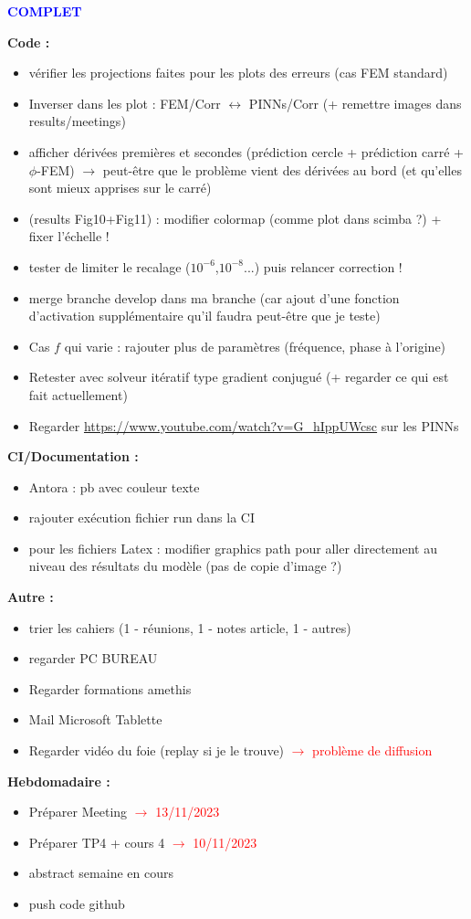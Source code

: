 \textcolor{blue}{\textbf{\large{COMPLET}}}

\textbf{Code :}
\begin{itemize}[label=$\square$]
	\item[\later] vérifier les projections faites pour les plots des erreurs (cas FEM standard)
	\item[\wontfix] Inverser dans les plot : FEM/Corr $\leftrightarrow$ PINNs/Corr (+ remettre images dans results/meetings)
	\item[\done] afficher dérivées premières et secondes (prédiction cercle + prédiction carré + $\phi$-FEM) $\rightarrow$ peut-être que le problème vient des dérivées au bord (et qu'elles sont mieux apprises sur le carré)
	\item[\later] (results Fig10+Fig11) : modifier colormap (comme plot dans scimba ?) + fixer l'échelle !
	\item[\wontfix] tester de limiter le recalage ($10^{-6}$,$10^{-8}$...) puis relancer correction !
	\item[\later] merge branche develop dans ma branche (car ajout d'une fonction d'activation supplémentaire qu'il faudra peut-être que je teste)
	\item[\later] Cas $f$ qui varie : rajouter plus de paramètres (fréquence, phase à l'origine) 
	\item[\later] Retester avec solveur itératif type gradient conjugué (+ regarder ce qui est fait actuellement)
	\item[\later] Regarder \url{https://www.youtube.com/watch?v=G_hIppUWcsc} sur les PINNs
\end{itemize}
\textbf{CI/Documentation :}
\begin{itemize}[label=$\square$]
	\item[\later] Antora : pb avec couleur texte
	\item[\done] rajouter exécution fichier run dans la CI
	\item[\wontfix] pour les fichiers Latex : modifier graphics path pour aller directement au niveau des résultats du modèle (pas de copie d'image ?) 
\end{itemize}
\textbf{Autre :}
\begin{itemize}[label=$\square$]
	\item[\done] trier les cahiers (1 - réunions, 1 - notes article, 1 - autres)
	\item[\done] regarder PC BUREAU
	\item[\later] Regarder formations amethis
	\item[\done] Mail Microsoft Tablette
	\item[\wontfix] Regarder vidéo du foie (replay si je le trouve) \textcolor{red}{$\rightarrow$ problème de diffusion}
\end{itemize}
\textbf{Hebdomadaire :}
\begin{itemize}[label=$\square$]
	\item[\done] Préparer Meeting \textcolor{red}{$\rightarrow$ 13/11/2023}
	\item[\done] Préparer TP4 + cours 4 \textcolor{red}{$\rightarrow$ 10/11/2023}
	\item[\done] abstract semaine en cours
	\item[\done] push code github
\end{itemize}